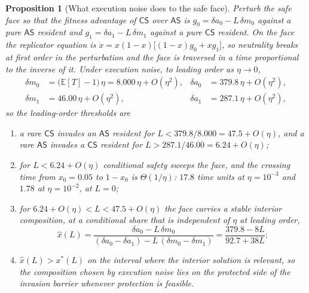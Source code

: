 \documentclass[pdflatex]{sn-jnl}
\theoremstyle{thmstyleone}
\newtheorem{proposition}[theorem]{Proposition}
\theoremstyle{thmstylethree}
\theoremstyle{thmstyletwo}
\newcommand{\AS}{\textsf{AS}}
\newcommand{\CS}{\textsf{CS}}
\begin{document}
\begin{proposition}[What execution noise does to the safe face]\label{prop:rate}
Perturb the safe face so that the fitness advantage of $\CS$ over $\AS$ is
$g_{0}=\delta a_{0}-L\,\delta m_{0}$ against a pure $\AS$ resident and
$g_{1}=\delta a_{1}-L\,\delta m_{1}$ against a pure $\CS$ resident. On the
face the replicator equation is
$\dot x=x(1-x)\big[(1-x)g_{0}+xg_{1}\big]$, so neutrality breaks at first
order in the perturbation and the face is traversed in a time proportional to
the inverse of it. Under execution noise, to leading order as $\eta\to0$,
\begin{equation}
\begin{aligned}
\delta m_{0}&=\big(\mathbb{E}[T]-1\big)\,\eta=8.000\,\eta+O(\eta^2),
 &\delta a_{0}&=379.8\,\eta+O(\eta^2),\\
\delta m_{1}&=46.00\,\eta+O(\eta^2),
 &\delta a_{1}&=287.1\,\eta+O(\eta^2),
\end{aligned}
\label{eq:rate}
\end{equation}
so the leading-order thresholds are
\begin{enumerate}
\item[(i)] a rare $\CS$ invades an $\AS$ resident for
$L<379.8/8.000=47.5+O(\eta)$, and a rare $\AS$ invades a $\CS$ resident for
$L>287.1/46.00=6.24+O(\eta)$;
\item[(ii)] for $L<6.24+O(\eta)$ conditional safety sweeps the face, and the crossing
time from $x_{0}=0.05$ to $1-x_{0}$ is $\Theta(1/\eta)$: $17.8$ time units at
$\eta=10^{-3}$ and $1.78$ at $\eta=10^{-2}$, at $L=0$;
\item[(iii)] for $6.24+O(\eta)<L<47.5+O(\eta)$ the face carries a stable interior
composition, at a conditional share that is independent of $\eta$ at leading
order,
\begin{equation}
\hat x(L)=\frac{\delta a_{0}-L\,\delta m_{0}}
               {(\delta a_{0}-\delta a_{1})-L\,(\delta m_{0}-\delta m_{1})}
         =\frac{379.8-8L}{92.7+38L};
\label{eq:xhat}
\end{equation}
\item[(iv)] $\hat x(L)>x^{*}(L)$ on the interval where the interior solution is
relevant, so the composition chosen by execution noise lies on the protected
side of the invasion barrier whenever protection is feasible.
\end{enumerate}
\end{proposition}
\end{document}
